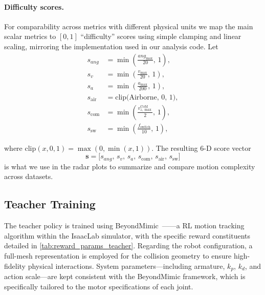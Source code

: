 \paragraph{Difficulty scores.}
For comparability across metrics with different physical units we map the main scalar metrics to $[0,1]$ “difficulty'' scores using simple clamping and linear scaling,
mirroring the implementation used in our analysis code.
Let
\[
\begin{aligned}
s_{ang}   &= \min\!\left(\frac{ang_{\max}}{20},\,1\right), \\
s_v       &= \min\!\left(\frac{v_{\max}}{20},\,1\right), \\
s_a       &= \min\!\left(\frac{a_{\max}}{200},\,1\right), \\
s_{\text{air}} &= \mathrm{clip}\!\bigl(\mathrm{Airborne},\,0,\,1\bigr), \\
s_{\text{com}} &= \min\!\left(\frac{v^{\mathrm{CoM}}_{z,\max}}{2},\,1\right), \\
s_{\text{sw}}  &= \min\!\left(\frac{f_{\text{switch}}}{10},\,1\right),
\end{aligned}
\]

where $\mathrm{clip}(x,0,1)=\max(0,\min(x,1))$.
The resulting 6-D score vector
\begin{equation}
 \mathbf{s} = \bigl[s_{ang},\,s_v,\,s_a,\,s_{\text{com}},\,s_{\text{air}},\,s_{\text{sw}}\bigr]
\end{equation}
is what we use in the radar plots to summarize and compare motion complexity across datasets.

\subsection{Teacher Training}
The teacher policy is trained using BeyondMimic~\cite{liao2025beyondmimic}——a RL motion tracking algorithm within the IsaacLab simulator, with the specific reward constituents detailed in \cref{tab:reward_params_teacher}. Regarding the robot configuration, a full-mesh representation is employed for the collision geometry to ensure high-fidelity physical interactions. System parameters—including armature, $k_p$, $k_d$, and action scale—are kept consistent with the BeyondMimic framework, which is specifically tailored to the motor specifications of each joint.

